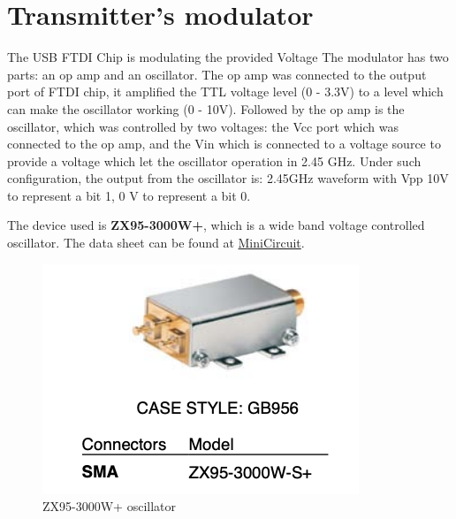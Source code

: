 \documentclass[12pt,a4paper]{report}
\begin{document}


\chapter{Transmitter's modulator}
The USB FTDI Chip is modulating the provided Voltage
The modulator has two parts: an op amp and an oscillator. The op amp was connected to the output port of FTDI chip, it amplified the TTL voltage level (0 - 3.3V) to a level which can make the oscillator working (0 - 10V). Followed by the op amp is the oscillator, which was controlled by two voltages: the Vcc port which was connected to the op amp, and the Vin which is connected to a voltage source to provide a voltage which let the oscillator operation in 2.45 GHz.
Under such configuration, the output from the oscillator is: 2.45GHz waveform with Vpp 10V to represent a bit 1, 0 V to represent a bit 0.

The device used is \textbf{ZX95-3000W+}, which is a wide band voltage controlled oscillator. The data sheet can be found at \href{https://www.minicircuits.com/pdfs/ZX95-3000W+.pdf}{MiniCircuit}.

\begin{figure}[ht]
    \centerline{\includegraphics[scale=1.5]{osc}}
    \caption{ZX95-3000W+ oscillator}
    \label{fig:osc}
\end{figure}
\end{document}
